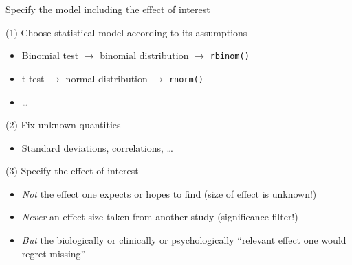 \documentclass[aspectratio=169]{beamer}
\begin{document}
\begin{frame}{Specify the model including the effect of interest}

(1) Choose statistical model according to its assumptions
\begin{itemize}
\item Binomial test $\to$ binomial distribution $\to$ \texttt{rbinom()}

\item t-test $\to$ normal distribution $\to$ \texttt{rnorm()}

\item \dots\\[1ex]
\end{itemize}

(2) Fix unknown quantities
\begin{itemize}
\item Standard deviations, correlations, \dots \\[1ex]

\end{itemize}

(3) Specify the effect of interest
\begin{itemize}

\item \emph{Not} the effect one expects or hopes to find (size of effect is
unknown!)

\item \emph{Never} an effect size taken from another study (significance
filter!)

\item \emph{But} the biologically or clinically or psychologically ``relevant
effect one would regret missing'' \citep{Harrell20}
\end{itemize}

\end{frame}
\end{document}

